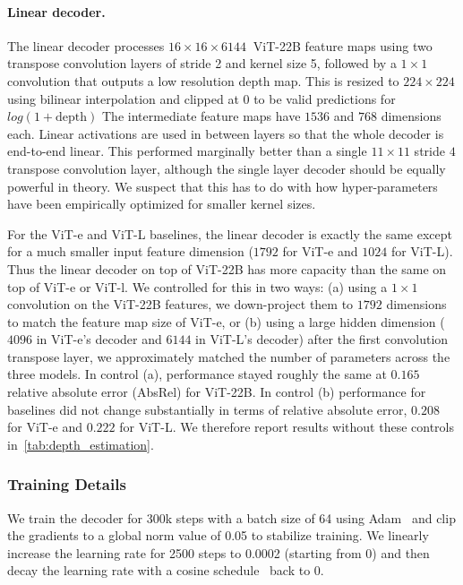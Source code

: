 \documentclass{article}
\begin{document}
\paragraph{Linear decoder.}

The linear decoder processes $16\times 16 \times 6144~$ ViT-22B feature maps using two transpose convolution layers of stride 2 and kernel size 5, followed by a $1\times 1$ convolution that outputs a low resolution depth map.
This is resized to $224\times 224$ using bilinear interpolation and clipped at $0$ to be valid predictions for $log\left(1 + \mathrm{depth}\right)$
The intermediate feature maps have $1536$ and $768$ dimensions each.
Linear activations are used in between layers so that the whole decoder is end-to-end linear.
This performed marginally better than a single $11\times 11$ stride $4$ transpose convolution layer, although the single layer decoder should be equally powerful in theory.
We suspect that this has to do with how hyper-parameters have been empirically optimized for smaller kernel sizes.

For the ViT-e and ViT-L baselines, the linear decoder is exactly the same except for a much smaller input feature dimension ($1792$ for ViT-e and $1024$ for ViT-L).
Thus the linear decoder on top of ViT-22B has more capacity than the same on top of ViT-e or ViT-l.
We controlled for this in two ways: (a) using a $1\times 1$ convolution on the ViT-22B features, we down-project them to $1792$ dimensions to match the feature map size of ViT-e, or (b) using a large hidden dimension ($4096$ in ViT-e's decoder and $6144$ in ViT-L's decoder) after the first convolution transpose layer, we approximately matched the number of parameters across the three models. In control (a), performance stayed roughly the same at $0.165$ relative absolute error (AbsRel) for ViT-22B. In control (b) performance for baselines did not change substantially in terms of relative absolute error, $0.208$ for ViT-e and $0.222$ for ViT-L. We therefore report results without these controls in~\cref{tab:depth_estimation}.

\subsubsection{Training Details}

We train the decoder for 300k steps with a batch size of 64 using Adam~\citep{kingma2014adam} and clip the gradients to a global norm value of 0.05 to stabilize training.
We linearly increase the learning rate for 2500 steps to 0.0002 (starting from 0) and then decay the learning rate with a cosine schedule~\citep{loshchilov2016sgdr} back to 0.
\end{document}
